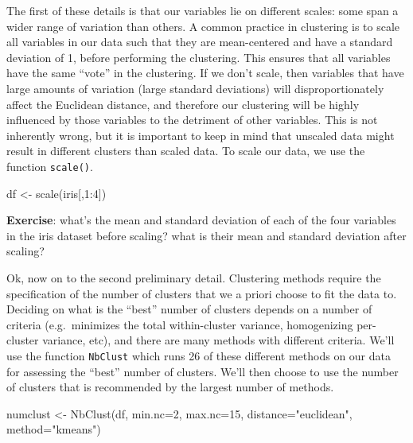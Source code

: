 \documentclass[
]{book}
\newenvironment{Shaded}{\begin{snugshade}}{\end{snugshade}}
\newcommand{\AttributeTok}[1]{\textcolor[rgb]{0.77,0.63,0.00}{#1}}
\newcommand{\DecValTok}[1]{\textcolor[rgb]{0.00,0.00,0.81}{#1}}
\newcommand{\FunctionTok}[1]{\textcolor[rgb]{0.00,0.00,0.00}{#1}}
\newcommand{\NormalTok}[1]{#1}
\newcommand{\OtherTok}[1]{\textcolor[rgb]{0.56,0.35,0.01}{#1}}
\newcommand{\SpecialCharTok}[1]{\textcolor[rgb]{0.00,0.00,0.00}{#1}}
\newcommand{\StringTok}[1]{\textcolor[rgb]{0.31,0.60,0.02}{#1}}
\begin{document}
The first of these details is that our variables lie on different scales: some span a wider range of variation than others. A common practice in clustering is to scale all variables in our data such that they are mean-centered and have a standard deviation of 1, before performing the clustering. This ensures that all variables have the same ``vote'' in the clustering. If we don't scale, then variables that have large amounts of variation (large standard deviations) will disproportionately affect the Euclidean distance, and therefore our clustering will be highly influenced by those variables to the detriment of other variables. This is not inherently wrong, but it is important to keep in mind that unscaled data might result in different clusters than scaled data. To scale our data, we use the function \texttt{scale()}.

\begin{Shaded}
\begin{Highlighting}[]
\NormalTok{df }\OtherTok{\textless{}{-}} \FunctionTok{scale}\NormalTok{(iris[,}\DecValTok{1}\SpecialCharTok{:}\DecValTok{4}\NormalTok{])}
\end{Highlighting}
\end{Shaded}

\textbf{Exercise}: what's the mean and standard deviation of each of the four variables in the iris dataset before scaling? what is their mean and standard deviation after scaling?

Ok, now on to the second preliminary detail. Clustering methods require the specification of the number of clusters that we a priori choose to fit the data to. Deciding on what is the ``best'' number of clusters depends on a number of criteria (e.g.~minimizes the total within-cluster variance, homogenizing per-cluster variance, etc), and there are many methods with different criteria. We'll use the function \texttt{NbClust} which runs 26 of these different methods on our data for assessing the ``best'' number of clusters. We'll then choose to use the number of clusters that is recommended by the largest number of methods.

\begin{Shaded}
\begin{Highlighting}[]
\NormalTok{numclust }\OtherTok{\textless{}{-}} \FunctionTok{NbClust}\NormalTok{(df, }\AttributeTok{min.nc=}\DecValTok{2}\NormalTok{, }\AttributeTok{max.nc=}\DecValTok{15}\NormalTok{, }\AttributeTok{distance=}\StringTok{"euclidean"}\NormalTok{, }\AttributeTok{method=}\StringTok{"kmeans"}\NormalTok{)}
\end{Highlighting}
\end{Shaded}
\end{document}
